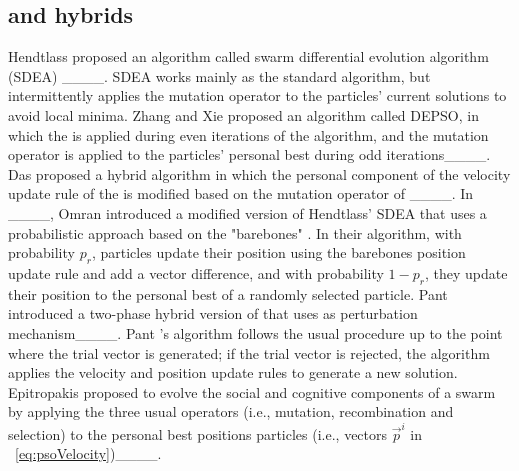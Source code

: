 \subsection{\PSO and \DE hybrids}
Hendtlass proposed an algorithm called swarm differential evolution algorithm (SDEA) ____. SDEA works mainly as the standard \PSO algorithm, but intermittently applies the \DE mutation operator to the particles' current solutions to avoid local minima. %
Zhang and Xie proposed an algorithm called DEPSO, in which the \stanPSO is applied during even iterations of the algorithm, and the \DE mutation operator is applied to the particles' personal best during odd iterations____.
Das \etal proposed a hybrid algorithm in which the personal component of the velocity update rule of the \stanPSO is modified based on the mutation operator of \DE____.
In ____, Omran \etal introduced a modified version of Hendtlass’ SDEA that uses a probabilistic approach based on the "barebones" \PSO. 
In their algorithm, with probability $p_r$, particles update their position using the barebones \PSO position update rule and add a vector difference, and with probability $1-p_r$, they update their position to the personal best of a randomly selected particle.
Pant \etal introduced a two-phase hybrid version of \DE that uses \PSO as perturbation mechanism____. Pant \etal's algorithm follows the usual \DE procedure up to the point where the trial vector is generated; if the trial vector is rejected, the algorithm applies the \PSO velocity and position update rules to generate a new solution.
Epitropakis \etal proposed to evolve the social and cognitive components of a swarm by applying the three usual \DE operators (i.e., mutation, recombination and selection) to the personal best positions particles (i.e., vectors $\vec{p}^{i}$ in \Eq~\ref{eq:psoVelocity})____. 


